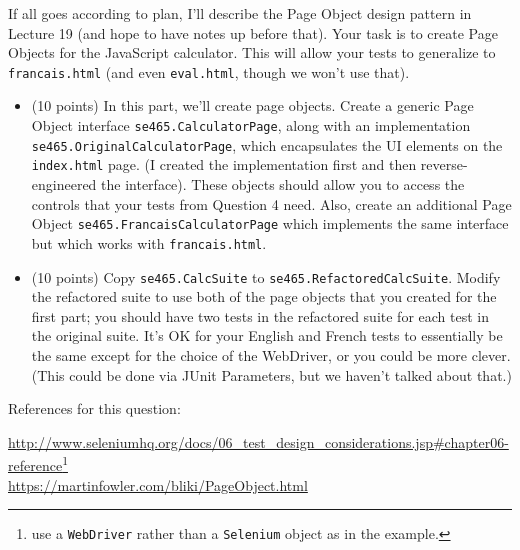 \documentclass[10pt,hidelinks]{article}
\begin{document}
If all goes according to plan, I'll describe the Page Object design pattern in Lecture 19 (and hope to have notes up before that). Your task is to create Page Objects for the JavaScript calculator. This will allow your tests to generalize to {\tt francais.html} (and even
{\tt eval.html}, though we won't use that).

\begin{itemize}
\item (10 points) In this part, we'll create page objects. Create a generic Page Object interface {\tt se465.CalculatorPage}, along with an implementation {\tt se465.OriginalCalculatorPage}, which encapsulates the UI elements on the {\tt index.html} page. (I created the implementation first and then reverse-engineered the interface). These objects should allow you to access the controls that your tests from Question 4 need. Also, create an additional Page Object {\tt se465.FrancaisCalculatorPage} which implements the same interface but which works with {\tt francais.html}. 
  \item (10 points) Copy {\tt se465.CalcSuite} to {\tt se465.RefactoredCalcSuite}. Modify the refactored suite to use both of the page objects that you created for the first part; you should have two tests in the refactored suite for each test in the original suite. It's OK for your English and French tests to essentially be the same except for the choice of the WebDriver, or you could be more clever. (This could be done via JUnit Parameters, but we haven't talked about that.)
\end{itemize}

References for this question:

\url{http://www.seleniumhq.org/docs/06_test_design_considerations.jsp#chapter06-reference}\footnote{use a {\tt WebDriver} rather than a {\tt Selenium} object as in the example.}
\\
\url{https://martinfowler.com/bliki/PageObject.html}
\end{document}
